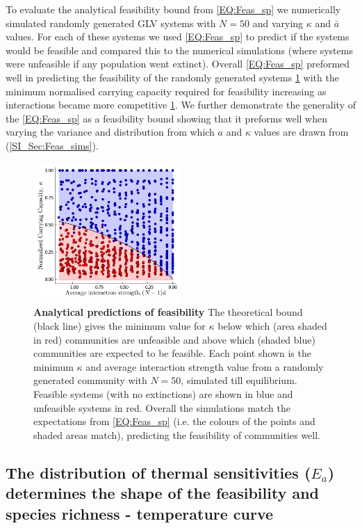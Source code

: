 \documentclass{article}
\begin{document}
To evaluate the analytical feasibility bound from \cref{EQ:Feas_sp} we numerically simulated randomly generated GLV systems with $N = 50$ and varying $\kappa$ and $\bar{a}$ values. For each of these systems we used \cref{EQ:Feas_sp} to predict if the systems would be feasible and compared this to the numerical simulations (where systems were unfeasible if any population went extinct). Overall \cref{EQ:Feas_sp} preformed well in predicting the feasibility of the randomly generated systems \cref{Fig:Feasability_Bound} with the minimum normalised carrying capacity required for feasibility increasing as interactions became more competitive \cref{Fig:Feasability_Bound}. We further demonstrate the generality of the \cref{EQ:Feas_sp} as a feasibility bound showing that it preforms well when varying the variance and distribution from which $a$ and $\kappa$ values are drawn from (\cref{SI_Sec:Feas_sims}). 

\begin{figure}[h] 
    \centering
    \includegraphics[width = 0.5\textwidth]{docs/Figures/Fig_1.pdf}
    \caption[width = \textwidth]{\textbf{Analytical predictions of feasibility} The theoretical bound (black line) gives the minimum value for $\kappa$ below which (area shaded in red) communities are unfeasible and above which (shaded blue) communities are expected to be feasible. Each point shown is the minimum $\kappa$ and average interaction strength value from a randomly generated community with $N=50$, simulated till equilibrium. Feasible systems (with no extinctions) are shown in blue and unfeasible systems in red. Overall the simulations match the expectations from \cref{EQ:Feas_sp} (i.e. the colours of the points and shaded areas match), predicting the feasibility of communities well.}
    \label{Fig:Feasability_Bound}
\end{figure}

\subsection{The distribution of thermal sensitivities ($E_a$)  determines the shape of the feasibility and species richness - temperature curve}
\end{document}
